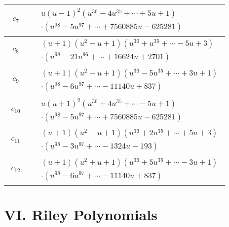\documentclass[1p]{elsarticle_modified}
\theoremstyle{definition}
\begin{document}
\begin{tabular}{m{50pt}|m{274pt}}
\hline $$\begin{aligned}c_{7}\end{aligned}$$&$\begin{aligned}
&u(u-1)^2(u^{36}-4 u^{35}+\cdots+5 u+1)\\
&\cdot(u^{98}-5 u^{97}+\cdots+7560885 u-625281)
\end{aligned}$\\
\hline $$\begin{aligned}c_{8}\end{aligned}$$&$\begin{aligned}
&(u+1)(u^2- u+1)(u^{36}+u^{35}+\cdots-5 u+3)\\
&\cdot(u^{98}-21 u^{96}+\cdots+16624 u+2701)
\end{aligned}$\\
\hline $$\begin{aligned}c_{9}\end{aligned}$$&$\begin{aligned}
&(u+1)(u^2- u+1)(u^{36}-5 u^{35}+\cdots+3 u+1)\\
&\cdot(u^{98}-6 u^{97}+\cdots-11140 u+837)
\end{aligned}$\\
\hline $$\begin{aligned}c_{10}\end{aligned}$$&$\begin{aligned}
&u(u+1)^2(u^{36}+4 u^{35}+\cdots-5 u+1)\\
&\cdot(u^{98}-5 u^{97}+\cdots+7560885 u-625281)
\end{aligned}$\\
\hline $$\begin{aligned}c_{11}\end{aligned}$$&$\begin{aligned}
&(u+1)(u^2- u+1)(u^{36}+2 u^{35}+\cdots+5 u+3)\\
&\cdot(u^{98}-3 u^{97}+\cdots-1324 u-193)
\end{aligned}$\\
\hline $$\begin{aligned}c_{12}\end{aligned}$$&$\begin{aligned}
&(u+1)(u^2+u+1)(u^{36}+5 u^{35}+\cdots-3 u+1)\\
&\cdot(u^{98}-6 u^{97}+\cdots-11140 u+837)
\end{aligned}$\\
\hline
\end{tabular}\newpage\renewcommand{\arraystretch}{1}
\centering \section*{ VI. Riley Polynomials}
\end{document}

